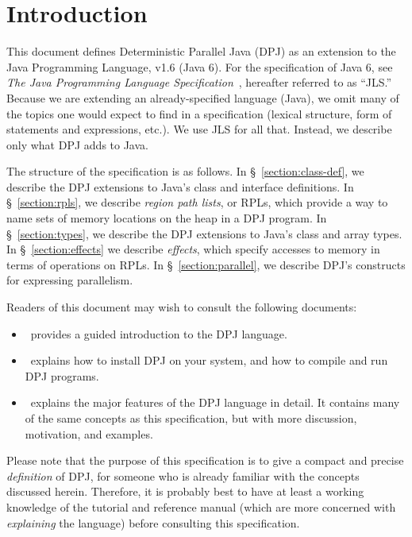 \section{Introduction}
\label{section:intro}

This document defines Deterministic Parallel Java (DPJ) as an
extension to the Java Programming Language, v1.6 (Java 6).  For the
specification of Java 6, see \emph{The Java Programming Language
  Specification}~\cite{JLS}, hereafter referred to as ``JLS.''
Because we are extending an already-specified language (Java), we omit
many of the topics one would expect to find in a specification
(lexical structure, form of statements and expressions, etc.).  We use
JLS for all that.  Instead, we describe only what DPJ adds to Java.

The structure of the specification is as follows.  In
\S~\ref{section:class-def}, we describe the DPJ extensions to Java's
class and interface definitions.  In \S~\ref{section:rpls}, we
describe \emph{region path lists}, or RPLs, which provide a way to
name sets of memory locations on the heap in a DPJ program.  In
\S~\ref{section:types}, we describe the DPJ extensions to Java's class
and array types.  In \S~\ref{section:effects} we describe
\emph{effects}, which specify accesses to memory in terms of
operations on RPLs.  In \S~\ref{section:parallel}, we describe DPJ's
constructs for expressing parallelism.

Readers of this document may wish to consult the following documents:
%
\begin{itemize}
%
\item \tutorial\ provides a guided introduction to the DPJ language.
%
\item \installmanual\ explains how to install DPJ on your system, and
  how to compile and run DPJ programs.
%
\item {}\ explains the major features of the DPJ language in
  detail.  It contains many of the same concepts as this
  specification, but with more discussion, motivation, and examples.
  
\end{itemize}
%

Please note that the purpose of this specification is to give a
compact and precise \emph{definition} of DPJ, for someone who is
already familiar with the concepts discussed herein.  Therefore, it is
probably best to have at least a working knowledge of the tutorial and
reference manual (which are more concerned with \emph{explaining} the
language) before consulting this specification.
